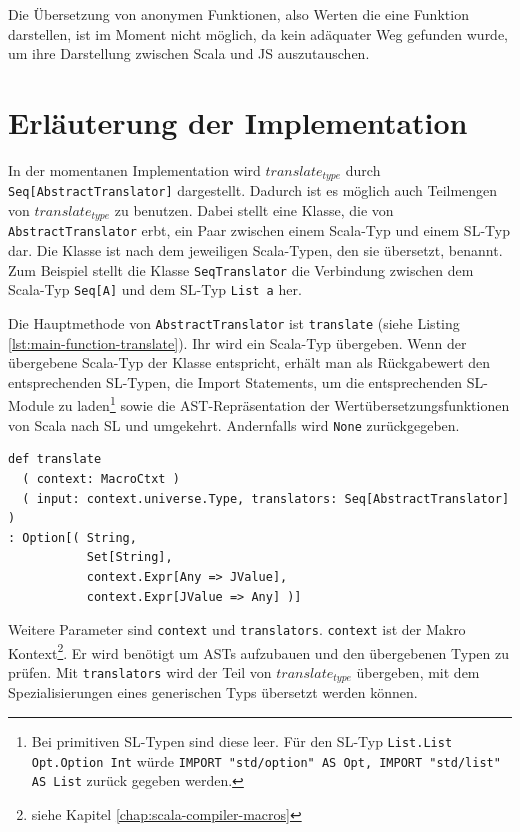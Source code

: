 \documentclass[12pt,bibtotoc]{scrreprt}
\begin{document}
Die Übersetzung von anonymen Funktionen, also Werten die eine Funktion darstellen, ist im Moment nicht möglich, da kein adäquater Weg gefunden wurde, um ihre Darstellung zwischen Scala und JS auszutauschen.

\section{Erläuterung der Implementation}
\label{sec:trans-implementation}

In der momentanen Implementation wird $translate_{type}$ durch \lstinline!Seq[AbstractTranslator]! dargestellt. Dadurch ist es möglich auch Teilmengen von $translate_{type}$ zu benutzen. Dabei stellt eine Klasse, die von \lstinline!AbstractTranslator! erbt, ein Paar zwischen einem Scala-Typ und einem SL-Typ dar. Die Klasse ist nach dem jeweiligen Scala-Typen, den sie übersetzt, benannt. Zum Beispiel stellt die Klasse \lstinline!SeqTranslator! die Verbindung zwischen dem Scala-Typ \lstinline!Seq[A]! und dem SL-Typ \lstinline!List a! her. 

Die Hauptmethode von \lstinline!AbstractTranslator! ist \lstinline!translate! (siehe Listing \ref{lst:main-function-translate}). Ihr wird ein Scala-Typ übergeben. Wenn der übergebene Scala-Typ der Klasse entspricht, erhält man als Rückgabewert den entsprechenden SL-Typen, die Import Statements, um die entsprechenden SL-Module zu laden\footnote{Bei primitiven SL-Typen sind diese leer. Für den SL-Typ \lstinline!List.List Opt.Option Int! würde \lstinline!IMPORT "std/option" AS Opt, IMPORT "std/list" AS List! zurück gegeben werden.} sowie die \ac{AST}-Repräsentation der Wertübersetzungsfunktionen von Scala nach SL und umgekehrt. Andernfalls wird \lstinline!None! zurückgegeben.

\begin{lstlisting}[caption=Hauptfunktion in AbstractTranslator, label=lst:main-function-translate]
def translate
  ( context: MacroCtxt )
  ( input: context.universe.Type, translators: Seq[AbstractTranslator] )
: Option[( String, 
           Set[String], 
           context.Expr[Any => JValue], 
           context.Expr[JValue => Any] )]
\end{lstlisting}

Weitere Parameter sind \lstinline!context! und \lstinline!translators!. \lstinline!context! ist der Makro Kontext\footnote{siehe Kapitel \ref{chap:scala-compiler-macros}}. Er wird benötigt um \ac{AST}s aufzubauen und den übergebenen Typen zu prüfen. Mit \lstinline!translators! wird der Teil von $translate_{type}$ übergeben, mit dem Spezialisierungen eines generischen Typs übersetzt werden können.
\end{document}
